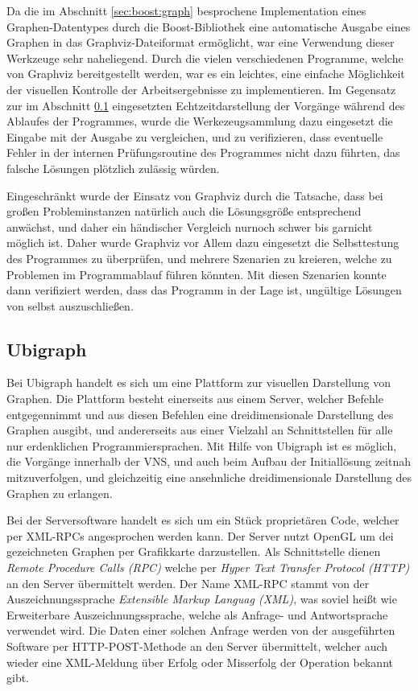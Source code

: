 Da die im Abschnitt \ref{sec:boost:graph} besprochene Implementation eines Graphen-Datentypes durch die Boost-Bibliothek eine automatische Ausgabe eines Graphen in das Graphviz-Dateiformat er\-möglicht, war 
eine Verwendung dieser Werkzeuge sehr naheliegend. Durch die vielen verschiedenen Programme, welche von Graphviz bereitgestellt werden, war es ein leichtes, eine einfache Möglichkeit der visuellen Kontrolle
der Arbeitsergebnisse zu implementieren. Im Gegensatz zur im Abschnitt \ref{sec:ubigraph} eingesetzten Echtzeitdarstellung der Vorgänge während des Ablaufes der Programmes, wurde die Werkezeugsammlung dazu eingesetzt
die Eingabe mit der Ausgabe zu vergleichen, und zu verifizieren, dass eventuelle Fehler in der internen Prüfungsroutine des Programmes nicht dazu führten, das falsche Lösungen plötzlich zulässig würden. 

Eingeschränkt wurde der Einsatz von Graphviz durch die Tatsache, dass bei großen Probleminstanzen natürlich auch die Lösungsgröße entsprechend anwächst, und daher ein händischer Vergleich nurnoch schwer bis garnicht möglich
ist. Daher wurde Graphviz vor Allem dazu eingesetzt die Selbsttestung des Programmes zu überprüfen, und mehrere Szenarien zu kreieren, welche zu Problemen im Programmablauf führen könnten. Mit diesen Szenarien
konnte dann verifiziert werden, dass das Programm in der Lage ist, ungültige Lösungen von selbst auszuschließen.


\subsection{Ubigraph}
\label{sec:ubigraph}
Bei Ubigraph handelt es sich um eine Plattform zur visuellen Darstellung von Graphen. Die Plattform besteht einerseits aus einem Server, welcher Befehle entgegennimmt und aus diesen Befehlen eine 
dreidimensionale Darstellung des Graphen ausgibt, und andererseits aus einer Vielzahl an Schnittstellen für alle nur erdenklichen Programmiersprachen. Mit Hilfe von Ubigraph ist es möglich, die
Vorgänge innerhalb der VNS, und auch beim Aufbau der Initiallösung zeitnah mitzuverfolgen, und gleichzeitig eine ansehnliche dreidimensionale Darstellung des Graphen zu erlangen.

Bei der Serversoftware handelt es sich um ein Stück proprietären Code, welcher per XML-RPCs angesprochen werden kann. Der Server nutzt OpenGL um dei gezeichneten Graphen per Grafikkarte darzustellen. Als
Schnittstelle dienen \textit{Remote Procedure Calls (RPC)} welche per \textit{Hyper Text Transfer Protocol (HTTP)} an den Server übermittelt werden. Der Name XML-RPC stammt von der Auszeichnungssprache
\textit{Extensible Markup Languag (XML)}, was soviel heißt wie Erweiterbare Auszeichnungssprache, welche als Anfrage- und Antwortsprache verwendet wird. Die Daten einer solchen Anfrage werden von der
ausgeführten Software per HTTP-POST-Methode an den Server übermittelt, welcher auch wieder eine XML-Meldung über Erfolg oder Misserfolg der Operation bekannt gibt. 

